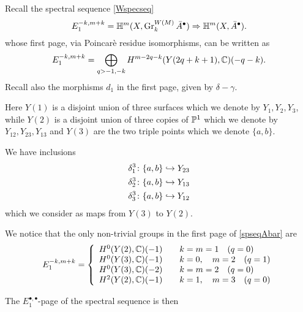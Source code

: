 \documentclass[../main.tex]{subfiles}
\begin{document}
Recall the spectral sequence \eqref{Wspecseq} 
\begin{equation} \label{spseqAbar}
E^{-k,m+k}_1=\mathbb{H}^{m}(X,\operatorname{Gr}^{W(M)}_{k}\bar A^\bullet) \Rightarrow \mathbb{H}^{m}(X,\bar A^\bullet).
\end{equation}
whose first page, via Poincarè residue isomorphisms, can be written as
\begin{align}
E^{-k,m+k}_1=\bigoplus_{q>-1,-k} H^{m-2q-k}( Y({2q+k+1}),\mathbb{C})(-q-k).  
\end{align}
Recall also the morphisms $d_1$ in the first page, given by $\delta-\gamma$.

Here $Y(1)$ is a disjoint union of three surfaces which we denote by $Y_1,Y_2,Y_3$, while $Y(2)$ is a disjoint union of three copies of $\mathbb{P}^1$ which we denote by $Y_{12},Y_{23},Y_{13}$ and $Y(3)$ are the two triple points which we denote $\{a,b\}$.

We have inclusions
\begin{align*}
    \delta_1^3 \colon \{a,b\} \hookrightarrow Y_{23} \\
    \delta_2^3 \colon \{a,b\} \hookrightarrow Y_{13} \\
    \delta_3^3 \colon \{a,b\} \hookrightarrow Y_{12} 
\end{align*}
which we consider as maps from $Y(3)$ to $Y(2)$.


We notice that the only non-trivial groups in the first page of \eqref{spseqAbar} are
\begin{align*}
      E_1^{-k,m+k} = \left\{\begin{array}{ll} 
 H^0(Y(2),\mathbb{C})(-1) &\quad k=m=1 \quad (q=0) \\ 
H^0(Y(3),\mathbb{C})(-1) &\quad k=0, \quad m=2 \quad (q=1)  \\ 
H^0(Y(3),\mathbb{C})(-2) &\quad k= m=2 \quad (q=0) \\ 
 H^2(Y(2),\mathbb{C})(-1) &\quad k=1, \quad m=3 \quad (q=0) \\ 
\end{array}\right.
\end{align*}

The $E_1^{\bullet,\bullet}$-page of the spectral sequence is then
 
\begin{center}
\end{center}
\end{document}
